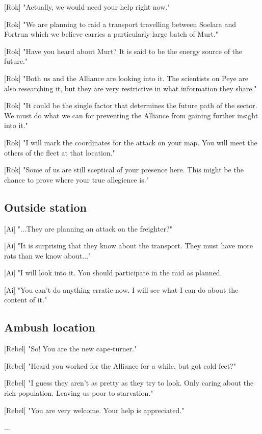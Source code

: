 \documentclass[a4paper,12pt]{article}
\begin{document}
[Rok] "Actually, we would need your help right now." 

[Rok] "We are planning to raid a transport travelling between Soelara and Fortrun which
we believe carries a particularly large batch of Murt."

[Rok] "Have you heard about Murt? It is said to be the energy source of the future."

[Rok] "Both us and the Alliance are looking into it. The scientists on Peye are also researching it,
but they are very restrictive in what information they share."

[Rok] "It could be the single factor that determines the future path of the sector. We must
do what we can for preventing the Alliance from gaining further insight into it."

[Rok] "I will mark the coordinates for the attack on your map. You will meet the others of the
fleet at that location."

[Rok] "Some of us are still sceptical of your presence here. This might be
the chance to prove where your true allegience is."

\subsection{Outside station}

[Ai] "...They are planning an attack on the freighter?" 

[Ai] "It is surprising that they know about the transport. They must have more rats than we know about..."

[Ai] "I will look into it. You should participate in the raid as planned. 

[Ai] "You can't do anything erratic now. I will see what I can do about the content of it."

\subsection{Ambush location}

[Rebel] "So! You are the new cape-turner."

[Rebel] "Heard you worked for the Alliance for a while, but got cold feet?" 

[Rebel] "I guess they aren't as pretty as they try to look. Only caring about the rich population. 
Leaving us poor to starvation."

[Rebel] "You are very welcome. Your help is appreciated."

...
\end{document}
